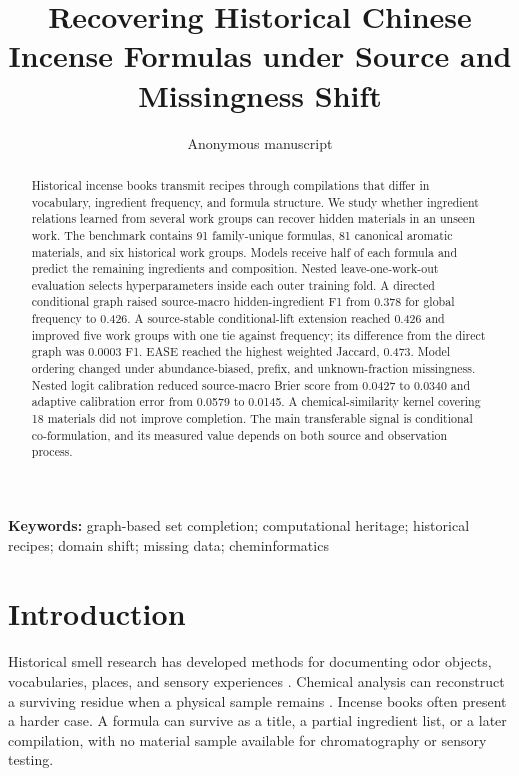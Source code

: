 \documentclass[11pt,a4paper]{article}
\title{Recovering Historical Chinese Incense Formulas under Source and Missingness Shift}
\author{Anonymous manuscript}
\date{}
\begin{document}
\maketitle

\begin{abstract}
Historical incense books transmit recipes through compilations that differ in vocabulary, ingredient frequency, and formula structure. We study whether ingredient relations learned from several work groups can recover hidden materials in an unseen work. The benchmark contains 91 family-unique formulas, 81 canonical aromatic materials, and six historical work groups. Models receive half of each formula and predict the remaining ingredients and composition. Nested leave-one-work-out evaluation selects hyperparameters inside each outer training fold. A directed conditional graph raised source-macro hidden-ingredient F1 from 0.378 for global frequency to 0.426. A source-stable conditional-lift extension reached 0.426 and improved five work groups with one tie against frequency; its difference from the direct graph was 0.0003 F1. EASE reached the highest weighted Jaccard, 0.473. Model ordering changed under abundance-biased, prefix, and unknown-fraction missingness. Nested logit calibration reduced source-macro Brier score from 0.0427 to 0.0340 and adaptive calibration error from 0.0579 to 0.0145. A chemical-similarity kernel covering 18 materials did not improve completion. The main transferable signal is conditional co-formulation, and its measured value depends on both source and observation process.
\end{abstract}

\noindent\textbf{Keywords:} graph-based set completion; computational heritage; historical recipes; domain shift; missing data; cheminformatics

\section{Introduction}

Historical smell research has developed methods for documenting odor objects, vocabularies, places, and sensory experiences \citep{bembibre2017_smell_heritage,lisena2022_odeuropa}. Chemical analysis can reconstruct a surviving residue when a physical sample remains \citep{paolin2026_historical_smells}. Incense books often present a harder case. A formula can survive as a title, a partial ingredient list, or a later compilation, with no material sample available for chromatography or sensory testing.
\end{document}

